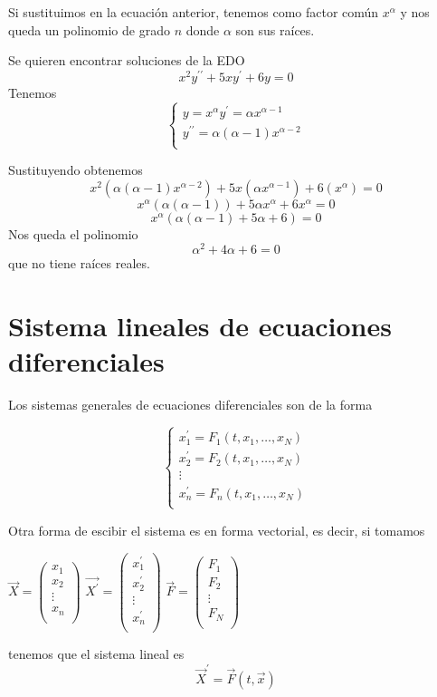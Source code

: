 \documentclass{mathnotes}
\begin{document}
Si sustituimos en la ecuación anterior, tenemos como factor común $x^\alpha$ y nos queda un polinomio de grado $n$ donde $\alpha$ son sus raíces.

\begin{example}
Se quieren encontrar soluciones de la EDO $$x^2y^{\prime\prime}+5xy^\prime+6y=0$$
Tenemos
\begin{equation*}
  \left\lbrace
  \begin{array}{l}
  	 y=x^\alpha
     y^\prime = \alpha x^{\alpha-1}\\
     y^{\prime\prime} = \alpha(\alpha-1)x^{\alpha-2}\\
  \end{array}
  \right.
\end{equation*}

Sustituyendo obtenemos
$$x^2(\alpha(\alpha-1)x^{\alpha-2})+5x(\alpha x^{\alpha-1})+6(x^\alpha) = 0$$
$$x^\alpha(\alpha(\alpha-1))+5\alpha x^\alpha+6x^\alpha = 0$$
$$x^\alpha(\alpha(\alpha-1)+5\alpha+6) = 0$$
Nos queda el polinomio
$$\alpha^2+4\alpha+6 = 0$$ que no tiene raíces reales.
\end{example}


\section{Sistema lineales de ecuaciones diferenciales}
Los sistemas generales de ecuaciones diferenciales son de la forma

\begin{equation*}
  \left\lbrace
  \begin{array}{l}
     x_1^\prime = F_1(t, x_1, \hdots, x_N)\\
     x_2^\prime = F_2(t, x_1, \hdots, x_N)\\
     \vdots\\
     x_n^\prime = F_n(t, x_1, \hdots, x_N)\\
  \end{array}
  \right.
\end{equation*}

Otra forma de escibir el sistema es en forma vectorial, es decir, si tomamos
\begin{center}
$\vec{X} = \begin{pmatrix}
x_1\\
x_2\\
\vdots\\
x_n\\
\end{pmatrix}$ $\vec{X^\prime} = \begin{pmatrix}
x_1^\prime\\
x_2^\prime\\
\vdots\\
x_n^\prime\\
\end{pmatrix}$ $\vec{F} = \begin{pmatrix}
F_1\\
F_2\\
\vdots\\
F_N\\
\end{pmatrix}$
\end{center}
tenemos que el sistema lineal es $$\vec{X}^\prime = \vec{F}(t, \vec{x})$$
\end{document}
